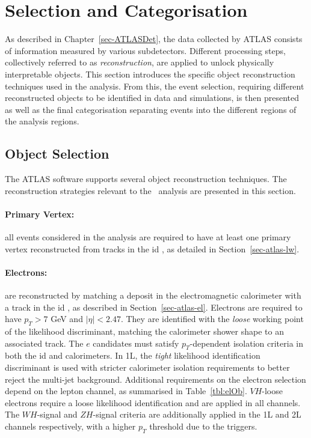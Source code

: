 
\section{Selection and Categorisation}\label{sec-selectionandcat}
As described in Chapter~\ref{sec-ATLASDet}, the data collected by ATLAS consists of information measured by various subdetectors. Different processing steps, collectively referred to as \textit{reconstruction}, are applied to unlock physically interpretable objects. This section introduces the specific object reconstruction techniques used in the analysis. From this, the event selection, requiring different reconstructed objects to be identified in data and simulations, is then presented as well as the final categorisation separating events into the different regions of the analysis regions.

\subsection{Object Selection}\label{sec-obj}
The ATLAS software supports several object reconstruction techniques. The reconstruction strategies relevant to the \vhbc\ analysis are presented in this section. 

\paragraph{Primary Vertex:} all events considered in the analysis are required to have at least one primary vertex reconstructed from tracks in the \gls{id} \cite{ATL-PHYS-PUB-2015-026}, as detailed in Section~\ref{sec-atlas-lw}.

\paragraph{Electrons:} are reconstructed by matching a deposit in the electromagnetic calorimeter with a track in the \gls{id} \cite{Aaboud:2657964, Aad_2019}, as described in Section~\ref{sec-atlas-el}. Electrons are required to have $p_T > 7$ GeV and $|\eta|<2.47$. They are identified with the \textit{loose} working point of the likelihood discriminant, matching the calorimeter shower shape to an associated track. The $e$ candidates must satisfy $p_T$-dependent isolation criteria in both the \gls{id} and calorimeters. In 1L, the \textit{tight} likelihood identification discriminant is used with stricter calorimeter isolation requirements to better reject the multi-jet background. Additional requirements on the electron selection depend on the lepton channel, as summarised in Table~\ref{tbl:elOb}. $VH$-loose electrons require a loose likelihood identification and are applied in all channels. The $WH$-signal and $ZH$-signal criteria are additionally applied in the 1L and 2L channels respectively, with a higher $p_T$ threshold due to the triggers. 

